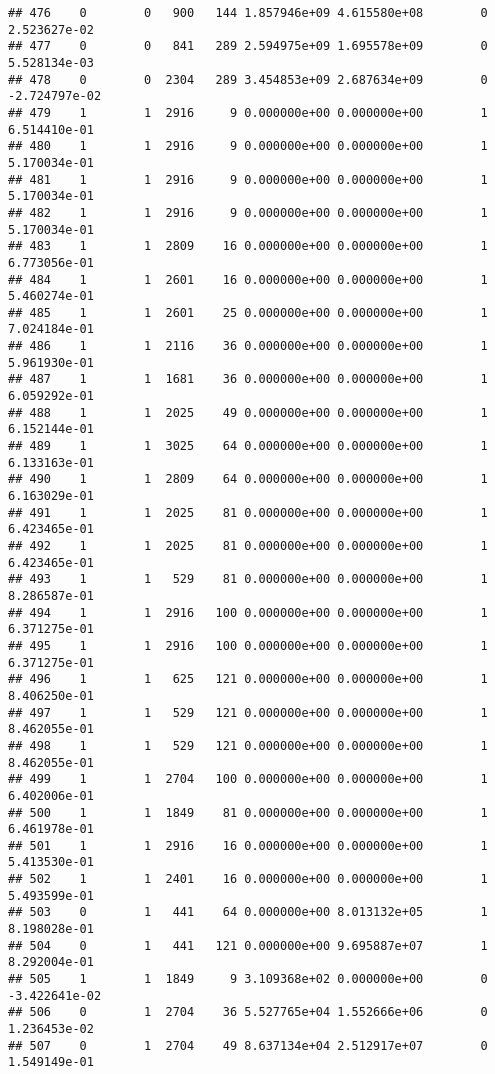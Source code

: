\documentclass[
]{article}
\begin{document}
\begin{enumerate}
\begin{verbatim}
## 476    0        0   900   144 1.857946e+09 4.615580e+08        0  2.523627e-02
## 477    0        0   841   289 2.594975e+09 1.695578e+09        0  5.528134e-03
## 478    0        0  2304   289 3.454853e+09 2.687634e+09        0 -2.724797e-02
## 479    1        1  2916     9 0.000000e+00 0.000000e+00        1  6.514410e-01
## 480    1        1  2916     9 0.000000e+00 0.000000e+00        1  5.170034e-01
## 481    1        1  2916     9 0.000000e+00 0.000000e+00        1  5.170034e-01
## 482    1        1  2916     9 0.000000e+00 0.000000e+00        1  5.170034e-01
## 483    1        1  2809    16 0.000000e+00 0.000000e+00        1  6.773056e-01
## 484    1        1  2601    16 0.000000e+00 0.000000e+00        1  5.460274e-01
## 485    1        1  2601    25 0.000000e+00 0.000000e+00        1  7.024184e-01
## 486    1        1  2116    36 0.000000e+00 0.000000e+00        1  5.961930e-01
## 487    1        1  1681    36 0.000000e+00 0.000000e+00        1  6.059292e-01
## 488    1        1  2025    49 0.000000e+00 0.000000e+00        1  6.152144e-01
## 489    1        1  3025    64 0.000000e+00 0.000000e+00        1  6.133163e-01
## 490    1        1  2809    64 0.000000e+00 0.000000e+00        1  6.163029e-01
## 491    1        1  2025    81 0.000000e+00 0.000000e+00        1  6.423465e-01
## 492    1        1  2025    81 0.000000e+00 0.000000e+00        1  6.423465e-01
## 493    1        1   529    81 0.000000e+00 0.000000e+00        1  8.286587e-01
## 494    1        1  2916   100 0.000000e+00 0.000000e+00        1  6.371275e-01
## 495    1        1  2916   100 0.000000e+00 0.000000e+00        1  6.371275e-01
## 496    1        1   625   121 0.000000e+00 0.000000e+00        1  8.406250e-01
## 497    1        1   529   121 0.000000e+00 0.000000e+00        1  8.462055e-01
## 498    1        1   529   121 0.000000e+00 0.000000e+00        1  8.462055e-01
## 499    1        1  2704   100 0.000000e+00 0.000000e+00        1  6.402006e-01
## 500    1        1  1849    81 0.000000e+00 0.000000e+00        1  6.461978e-01
## 501    1        1  2916    16 0.000000e+00 0.000000e+00        1  5.413530e-01
## 502    1        1  2401    16 0.000000e+00 0.000000e+00        1  5.493599e-01
## 503    0        1   441    64 0.000000e+00 8.013132e+05        1  8.198028e-01
## 504    0        1   441   121 0.000000e+00 9.695887e+07        1  8.292004e-01
## 505    1        1  1849     9 3.109368e+02 0.000000e+00        0 -3.422641e-02
## 506    0        1  2704    36 5.527765e+04 1.552666e+06        0  1.236453e-02
## 507    0        1  2704    49 8.637134e+04 2.512917e+07        0  1.549149e-01

\end{verbatim}
\end{enumerate}
\end{document}
